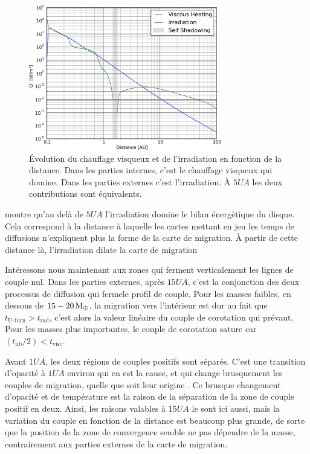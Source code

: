 \begin{figure}[htb]
\centering
\includegraphics[width=0.75\textwidth]{figure/migration_map/viscous_vs_irradiation.pdf}

\caption{Évolution du chauffage visqueux et de l'irradiation en fonction de la distance. Dans les parties internes, c'est le chauffage visqueux qui domine. Dans les parties externes c'est l'irradiation. À $5\unit{UA}$ les deux contributions sont équivalents.}\label{fig:viscous_vs_irradiation}
\end{figure}

 montre qu'au delà de $5\unit{UA}$ l'irradiation domine le bilan énergétique du disque. Cela correspond à la distance à laquelle les cartes mettant en jeu les temps de diffusions n'expliquent plus la forme de la carte de migration. À partir de cette distance là, l'irradiation dilate la carte de migration

Intéressons nous maintenant aux zones qui ferment verticalement les lignes de couple nul. Dans les parties externes, après $15\unit{UA}$, c'est la conjonction des deux processus de diffusion qui \og ferme\fg le profil de couple. Pour les masses faibles, en dessous de $15-20\mathrm{\thinspace M_\oplus}$, la migration vers l'intérieur est dur au fait que $t_\text{U-turn} > t_\text{rad}$, c'est alors la valeur linéaire du couple de corotation qui prévaut. Pour les masses plus importantes, le couple de corotation sature car $(t_\text{lib}/2) < t_\text{visc}$. 

Avant $1\unit{UA}$, les deux régions de couples positifs sont séparés. C'est une transition d'opacité à $1\unit{UA}$ environ qui en est la cause, et qui change brusquement les couples de migration, quelle que soit leur origine . Ce brusque changement d'opacité et de température est la raison de la séparation de la zone de couple positif en deux. Ainsi, les raisons valables à $15\unit{UA}$ le sont ici aussi, mais la variation du couple en fonction de la distance est beaucoup plus grande, de sorte que la position de la zone de convergence semble ne pas dépendre de la masse, contrairement aux parties externes de la carte de migration.

